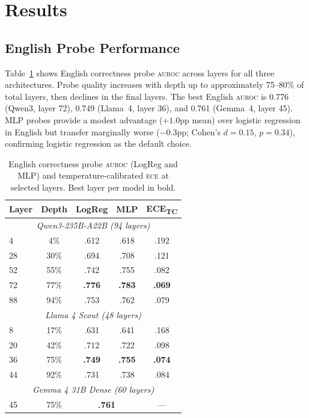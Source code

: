\documentclass[11pt,a4paper]{article}
\newcommand{\auroc}{\textsc{auroc}}
\newcommand{\ece}{\textsc{ece}}
\begin{document}
\section{Results}
\label{sec:results}

\subsection{English Probe Performance}

Table~\ref{tab:en_probe} shows English correctness probe \auroc{} across layers for all three architectures. Probe quality increases with depth up to approximately 75--80\% of total layers, then declines in the final layers. The best English \auroc{} is 0.776 (Qwen3, layer 72), 0.749 (Llama~4, layer 36), and 0.761 (Gemma~4, layer 45). MLP probes provide a modest advantage ($+1.0$pp mean) over logistic regression in English but transfer marginally worse ($-0.3$pp; Cohen's $d = 0.15$, $p = 0.34$), confirming logistic regression as the default choice.

\begin{table}[t]
\centering
\small
\begin{tabular}{@{}lcccc@{}}
\toprule
\textbf{Layer} & \textbf{Depth} & \textbf{LogReg} & \textbf{MLP} & \textbf{ECE\textsubscript{TC}} \\
\midrule
\multicolumn{5}{c}{\emph{Qwen3-235B-A22B (94 layers)}} \\
\midrule
4 & 4\% & .612 & .618 & .192 \\
28 & 30\% & .694 & .708 & .121 \\
52 & 55\% & .742 & .755 & .082 \\
72 & 77\% & \textbf{.776} & \textbf{.783} & \textbf{.069} \\
88 & 94\% & .753 & .762 & .079 \\
\midrule
\multicolumn{5}{c}{\emph{Llama 4 Scout (48 layers)}} \\
\midrule
8 & 17\% & .631 & .641 & .168 \\
20 & 42\% & .712 & .722 & .098 \\
36 & 75\% & \textbf{.749} & \textbf{.755} & \textbf{.074} \\
44 & 92\% & .731 & .738 & .084 \\
\midrule
\multicolumn{5}{c}{\emph{Gemma 4 31B Dense (60 layers)}} \\
\midrule
45 & 75\% & \multicolumn{2}{c}{\textbf{.761}} & — \\
\bottomrule
\end{tabular}
\caption{English correctness probe \auroc{} (LogReg and MLP) and temperature-calibrated \ece{} at selected layers. Best layer per model in bold.}
\label{tab:en_probe}
\end{table}
\end{document}
